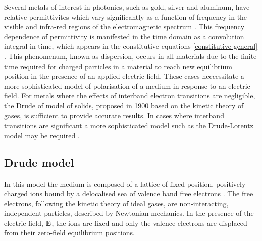 Several metals of interest in photonics, such as gold, silver and aluminum, have relative permittivites which vary significantly as a function of frequency in the visible and infra-red regions of the electromagnetic spectrum \cite{Ordal:1983bg}.
This frequency dependence of permittivity is manifested in the time domain as a convolution integral in time, which appears in the constitutive equations \eqref{constitutive-general} \cite{Jackson:490457}.
This phenomenum, known as dispersion, occurs in all materials due to the finite time required for charged particles in a material to reach new equilibrium position in the presence of an applied electric field.
These cases neccessitate a more sophisticated model of polarisation of a medium in response to an electric field. For metals where the effects of interband electron transitions are negligible, the Drude of model of solids, proposed in 1900 \cite{Drude:1900hg} based on the kinetic theory of gases, is sufficient to provide accurate results. In cases where interband transitions are significant a more sophisticated model such as the Drude-Lorentz model may be required \cite{Fox:2001wm,Taflove:1989ds}.

\subsection{Drude model}
\label{sub:The Drude Model}

In this model the medium is composed of a lattice of fixed-position, positively charged ions bound by a delocalised sea of valence band free electrons \cite{Ashcroft:2005wp,Bandyopadhyay:1503732}. The free electrons, following the kinetic theory of ideal gases, are non-interacting, independent particles, described by Newtonian mechanics. In the presence of the electric field, $\mathbf{E}$, the ions are fixed and only the valence electrons are displaced from their zero-field equilibrium positions.
%

